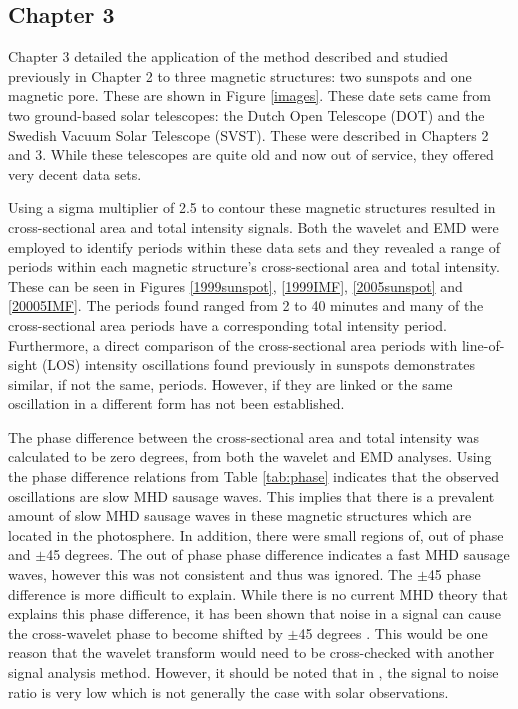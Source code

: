    	\subsection{Chapter 3}
    	
    Chapter 3 detailed the application of the method described and studied previously in Chapter 2 to three magnetic structures: two sunspots and one magnetic pore.
    These are shown in Figure \ref{images}.
    These date sets came from two ground-based solar telescopes: the Dutch Open Telescope (DOT) and the Swedish Vacuum Solar Telescope (SVST). 
    These were described in Chapters 2 and 3.
    While these telescopes are quite old and now out of service, they offered very decent data sets.
    
    Using a sigma multiplier of 2.5 to contour these magnetic structures
    resulted in cross-sectional area and total intensity signals.
    Both the wavelet and EMD were employed to identify periods within these data sets and they revealed a range of periods within each magnetic structure's cross-sectional area and total intensity.
    These can be seen in Figures \ref{1999sunspot}, \ref{1999IMF}, \ref{2005sunspot} and \ref{20005IMF}.
    The periods found ranged from 2 to 40 minutes and many of the cross-sectional area periods have a corresponding total intensity period.
    Furthermore, a direct comparison of the cross-sectional area periods with line-of-sight (LOS) intensity oscillations found previously in sunspots demonstrates similar, if not the same, periods.
    However, if they are linked or the same oscillation in a different form has not been established.
   
    The phase difference between the cross-sectional area and total intensity was calculated to be zero degrees, from both the wavelet and EMD analyses.
    Using the phase difference relations from Table \ref{tab:phase} indicates that the observed oscillations are slow MHD sausage waves. 
    This implies that there is a prevalent amount of slow MHD sausage waves in these magnetic structures which are located in the photosphere.
    In addition, there were small regions of, out of phase and $\pm$45 degrees.
    The out of phase phase difference indicates a fast MHD sausage waves, however this was not consistent and thus was ignored. 
    The $\pm$45 phase difference is more difficult to explain.
    While there is no current MHD theory that explains this phase difference, it has been shown that noise in a signal can cause the cross-wavelet phase to become shifted by $\pm$45 degrees \citep{2015A&A...579A..73M}.
    This would be one reason that the wavelet transform would need to be cross-checked with another signal analysis method.
    However, it should be noted that in \cite{2015A&A...579A..73M}, the signal to noise ratio is very low which is not generally the case with solar observations. 
    

